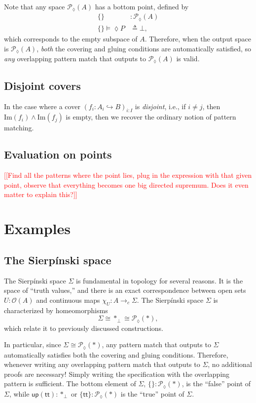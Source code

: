 \documentclass[conference]{IEEEtran}
\newcommand{\PLower}{\mathcal{P}_\lozenge}
\newcommand{\hookto}{\hookrightarrow}
\newcommand{\cto}{\to_c}
\newcommand{\One}{\ast}
\newcommand{\Open}[1]{\mathcal{O}({#1})}
\newcommand{\Img}[1]{\text{Im}\left({#1}\right)}
\newcommand{\note}[1]{\textcolor{red}{[[{#1}]]}}
\newcommand{\up}{\mathsf{up}}
\begin{document}
Note that any space $\PLower(A)$ has a bottom point, defined by
\begin{align*}
\{ \} &: \PLower(A)
\\ \{ \} \models \lozenge P &\triangleq \bot,
\end{align*}
which corresponds to the empty subspace of $A$. Therefore, when the output space is $\PLower(A)$, \emph{both} the covering and gluing conditions are automatically satisfied, so \emph{any} overlapping pattern match that outputs to $\PLower(A)$ is valid.

\subsection{Disjoint covers}

In the case where a cover $\left( f_i : A_i \hookto B \right)_{i : I}$ is \emph{disjoint}, i.e., if $i \ne j$, then $\Img{f_i} \wedge \Img{f_j}$ is empty, then we recover the ordinary notion of pattern matching.

\subsection{Evaluation on points}

\note{Find all the patterns where the point lies, plug in the expression with that given point, observe that everything becomes one big directed supremum. Does it even matter to explain this?}

\section{Examples}

\subsection{The Sierp\'inski space}

The Sierp\'inski space $\Sigma$ is fundamental in topology for several reasons. It is the space of ``truth values,'' and there is an exact correspondence between open sets $U : \Open{A}$ and continuous maps $\chi_U : A \cto \Sigma$. The Sierp\'inski space $\Sigma$ is characterized by homeomorphisms
\[
\Sigma \cong \One_\bot \cong \PLower(\One) ,
\]
which relate it to previously discussed constructions.

In particular, since $\Sigma \cong \PLower(\One)$, any pattern match that outputs to $\Sigma$ automatically satisfies both the covering and gluing conditions. Therefore, whenever writing any overlapping pattern match that outputs to $\Sigma$, no additional proofs are necessary! Simply writing the specification with the overlapping pattern is sufficient. The bottom element of $\Sigma$, $\{ \} : \PLower(\One)$, is the ``false'' point of $\Sigma$, while $\up(\mathsf{tt}) : \One_\bot$ or $\{ \mathsf{tt} \} : \PLower(\One)$ is the ``true'' point of $\Sigma$.
\end{document}
